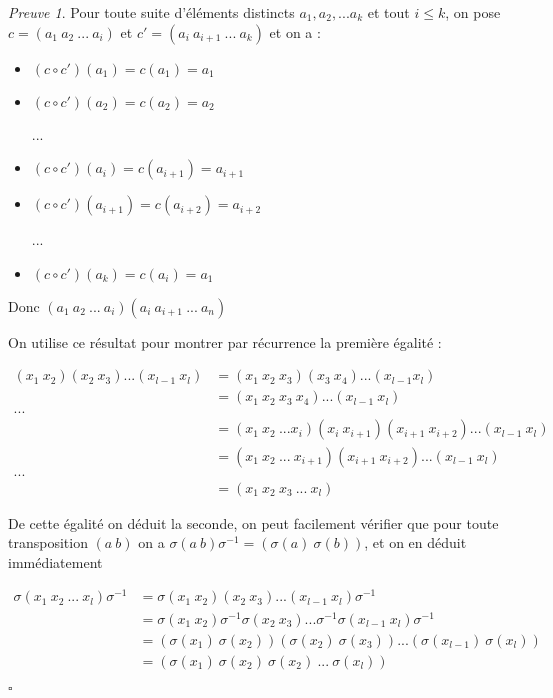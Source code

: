 \documentclass[]{article}
\theoremstyle{remark}
\newtheorem{myproof}{Preuve}
\theoremstyle{definition}
\newcommand{\cqfd}{
	\hfill$\square$
}
\begin{document}
\begin{myproof}
	Pour toute suite d'éléments distincts $a_1, a_2, ... a_k$ et tout $i \leqslant k$, on pose $c = (a_1 ~ a_2 ~ ... ~ a_i)$ et $c' = (a_i ~ a_{i+1} ~ ... ~ a_k)$ et on a :
	\begin{itemize}
		\item $(c \circ c')(a_1) = c(a_1)=a_1$
		\item $(c \circ c')(a_2) = c(a_2) = a_2$
		
		...
		
		\item $(c \circ c')(a_i) = c(a_{i+1})=a_{i+1}$
		\item $(c \circ c')(a_{i+1}) = c(a_{i+2})=a_{i+2}$
		
		...
		
		\item $(c \circ c')(a_{k}) = c(a_{i})=a_1$
	\end{itemize}

	Donc $(a_1 ~ a_2 ~ ... ~ a_i)(a_i ~ a_{i+1} ~ ... ~ a_{n})$
	
	On utilise ce résultat pour montrer par récurrence la première égalité :
	
	$$
	\begin{aligned}
		(x_1 ~ x_2)(x_2 ~ x_3) ... (x_{l-1} ~ x_l) &= (x_1 ~ x_2 ~ x_3)(x_3 ~ x_4) ... (x_{l-1} x_l) \\
		&= (x_1 ~ x_2 ~ x_3 ~ x_4)...(x_{l-1} ~ x_l) \\
		... \\
		&= (x_1 ~ x_2 ~ ... x_i)(x_i ~ x_{i+1})(x_{i+1} ~ x_{i+2})...(x_{l-1} ~ x_l) \\
		&= (x_1 ~ x_2 ~ ... ~ x_{i+1})(x_{i+1} ~ x_{i+2})...(x_{l-1} ~ x_l) \\
		...\\
		&= (x_1 ~ x_2 ~ x_3 ~ ... ~ x_l)
	\end{aligned}
	$$
	
	De cette égalité on déduit la seconde, on peut facilement vérifier que pour toute transposition $(a ~ b)$ on a $\sigma(a ~ b) \sigma^{-1}=(\sigma(a) ~ \sigma(b))$, et on en déduit immédiatement
	
	$$
	\begin{aligned}
		\sigma(x_1 ~ x_2 ~...~x_l)\sigma^{-1} &= \sigma(x_1 ~ x_2)(x_2 ~ x_3)...(x_{l-1} ~ x_l)\sigma^{-1} \\
		&=\sigma(x_1 ~ x_2)\sigma^{-1} \sigma(x_2 ~ x_3)...\sigma^{-1} \sigma(x_{l-1} ~ x_l)\sigma^{-1} \\
		&= (\sigma(x_1) ~ \sigma(x_2))(\sigma(x_2) ~ \sigma(x_3))...(\sigma(x_{l-1}) ~ \sigma(x_l)) \\
		&= (\sigma(x_1) ~ \sigma(x_2) ~ \sigma(x_2) ~ ... ~ \sigma(x_l))
	\end{aligned}
	$$
	
	\cqfd
\end{myproof}
\end{document}
